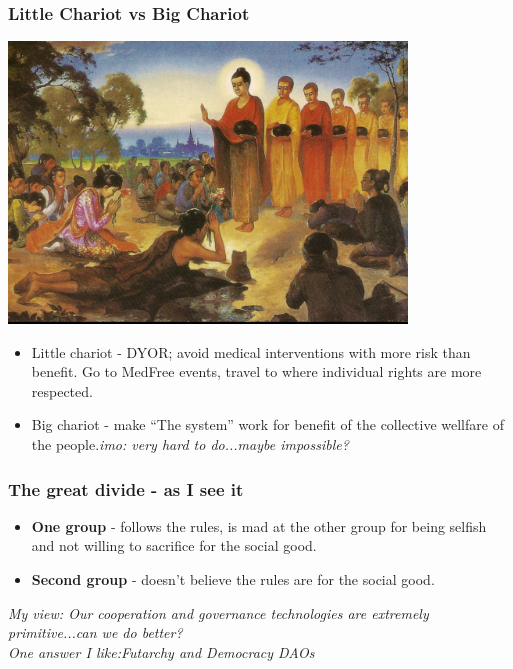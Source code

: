 \documentclass[shadesubsections,compress,14pt,mathserif]{beamer}
\newcommand{\nl}{\\ \pause \vspace{0.2in}}
\begin{document}
\begin{frame}
 \frametitle{Little Chariot vs Big Chariot}
  \includegraphics[width=300pt]{sumeda.png}
\end{frame}
\begin{frame}
\begin{itemize}
 \item Little chariot - DYOR; avoid medical interventions with more risk than benefit. Go to MedFree events, travel to where individual rights are more respected.\pause
 \item Big chariot - make ``The system'' work for benefit of the collective wellfare of the people.\emph{imo: very hard to do...maybe impossible?}
\end{itemize}

\end{frame}
\begin{frame}
 \frametitle{The great divide - as I see it}
 \begin{itemize}
  \item \textbf{One group}  - follows the rules, is mad at the other group for being selfish and not willing to sacrifice for the 
  social good.\pause
  \item \textbf{Second group} - doesn't believe the rules are for the social good.\pause
 \end{itemize}
\textit{My view: Our cooperation and governance technologies are extremely primitive...can we do better?}\nl
\textit{One answer I like:Futarchy and Democracy DAOs}

\end{frame}
\end{document}
